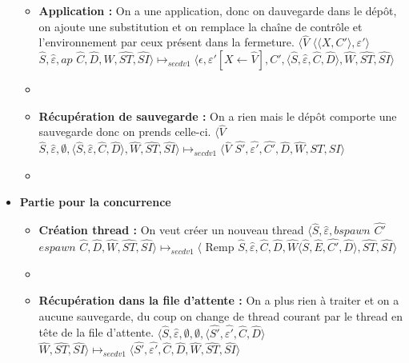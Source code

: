 \documentclass[10pt,a4paper]{article}
\begin{document}
\begin{itemize}
\begin{itemize}
							\item[] \textbf{Application :} On a une application, donc on dauvegarde dans le dépôt, on ajoute une substitution et on remplace la chaîne de contrôle et l'environnement par ceux présent dans la fermeture.
							\smallbreak
							$\langle\widehat{V}$ $\langle\langle X,C'\rangle,\varepsilon'\rangle$ $\widehat{S},\widehat{\varepsilon},ap$ $\widehat{C},\widehat{D},\widehat{W},\widehat{ST},\widehat{SI}\rangle 
							\longmapsto_{secdv1} 
							\langle\epsilon,\varepsilon'[X \leftarrow \widehat{V}],C',\langle\widehat{S},\widehat{\varepsilon},\widehat{C},\widehat{D}\rangle,\widehat{W},\widehat{ST},\widehat{SI}\rangle$
							\item[]
							\item[] \textbf{Récupération de sauvegarde :} On a rien mais le dépôt comporte une sauvegarde donc on prends celle-ci.
							\smallbreak
							$\langle\widehat{V}$ $\widehat{S},\widehat{\varepsilon},\emptyset,\langle\widehat{S},\widehat{\varepsilon},\widehat{C},\widehat{D}\rangle,\widehat{W},\widehat{ST},\widehat{SI}\rangle 
							\longmapsto_{secdv1} 
							\langle \widehat{V}$ $\widehat{S'},\widehat{\varepsilon'},\widehat{C'},\widehat{D},\widehat{W},\widehat{ST},\widehat{SI}\rangle$
							\item[]
						\end{itemize}
						\item[] \textbf{Partie pour la concurrence}
						\begin{itemize}
							\item[] \textbf{Création thread :} On veut créer un nouveau thread
							\smallbreak
							$\langle\widehat{S},\widehat{\varepsilon},bspawn$ $\widehat{C'}$ $espawn$ $\widehat{C},\widehat{D},\widehat{W},\widehat{ST},\widehat{SI}\rangle 
							\longmapsto_{secdv1} 
							\langle$ Remp $\widehat{S},\widehat{\varepsilon},\widehat{C},\widehat{D},\widehat{W}\langle\widehat{S},\widehat{E},\widehat{C'},\widehat{D}\rangle,\widehat{ST},\widehat{SI}\rangle$
							\item[]
							\item[] \textbf{Récupération dans la file d'attente :} On a plus rien à traiter et on a aucune sauvegarde, du coup on change de thread courant par le thread en tête de la file d'attente.
							\smallbreak $\langle\widehat{S},\widehat{\varepsilon},\emptyset,\emptyset,\langle\widehat{S'},\widehat{\varepsilon'},\widehat{C},\widehat{D}\rangle$ $\widehat{W},\widehat{ST},\widehat{SI}\rangle \longmapsto_{secdv1} \langle\widehat{S'},\widehat{\varepsilon'},\widehat{C},\widehat{D},\widehat{W},\widehat{ST},\widehat{SI}\rangle$

\end{itemize}
\end{itemize}
\end{document}
